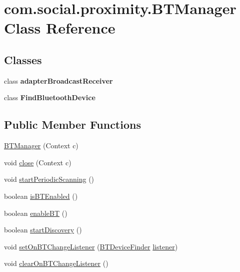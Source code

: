 \hypertarget{classcom_1_1social_1_1proximity_1_1_b_t_manager}{}\section{com.\+social.\+proximity.\+B\+T\+Manager Class Reference}
\label{classcom_1_1social_1_1proximity_1_1_b_t_manager}
\subsection*{Classes}
\begin{DoxyCompactItemize}
\item 
class {\bfseries adapter\+Broadcast\+Receiver}
\item 
class {\bfseries Find\+Bluetooth\+Device}
\end{DoxyCompactItemize}
\subsection*{Public Member Functions}
\begin{DoxyCompactItemize}
\item 
\hyperlink{classcom_1_1social_1_1proximity_1_1_b_t_manager_a9318f4d16d8ce1be6c1072f5da5f9633}{B\+T\+Manager} (Context c)
\item 
void \hyperlink{classcom_1_1social_1_1proximity_1_1_b_t_manager_a209fddd4a26c8248c9766d40ce816488}{close} (Context c)
\item 
void \hyperlink{classcom_1_1social_1_1proximity_1_1_b_t_manager_aad8cc9f7c753d63401b9074c24f38d5d}{start\+Periodic\+Scanning} ()
\item 
boolean \hyperlink{classcom_1_1social_1_1proximity_1_1_b_t_manager_a8ab82d4b9ababa83ed848f4563890830}{is\+B\+T\+Enabled} ()
\item 
boolean \hyperlink{classcom_1_1social_1_1proximity_1_1_b_t_manager_a92ae58750cb91f2fa1752a17f48ac1fc}{enable\+B\+T} ()
\item 
boolean \hyperlink{classcom_1_1social_1_1proximity_1_1_b_t_manager_af8e27092e6da5f3492eec59b372761de}{start\+Discovery} ()
\item 
void \hyperlink{classcom_1_1social_1_1proximity_1_1_b_t_manager_a98b7584f7687d3e7641df5a7528e95a1}{set\+On\+B\+T\+Change\+Listener} (\hyperlink{interfacecom_1_1social_1_1proximity_1_1_b_t_device_finder}{B\+T\+Device\+Finder} \hyperlink{classcom_1_1social_1_1proximity_1_1_b_t_manager_a5e3b7d29ab1ffb6832d42cc0c632f9ce}{listener})
\item 
void \hyperlink{classcom_1_1social_1_1proximity_1_1_b_t_manager_a6714c03500b096b802375e68c47f5410}{clear\+On\+B\+T\+Change\+Listener} ()
\end{DoxyCompactItemize}
